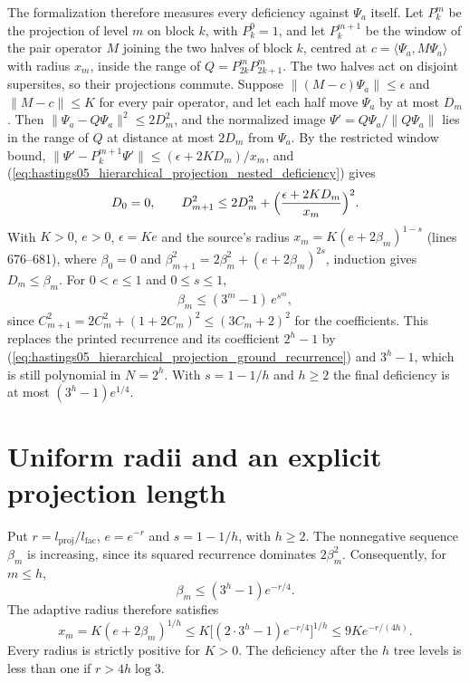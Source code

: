 \documentclass{article}
\begin{document}
The formalization therefore measures every deficiency against $\Psi_a$
itself. Let $P_k^m$ be the projection of level $m$ on block $k$, with
$P_k^0=1$, and let $P_k^{m+1}$ be the window of the pair operator $M$ joining
the two halves of block $k$, centred at $c=\langle\Psi_a,M\Psi_a\rangle$ with
radius $x_m$, inside the range of $Q=P_{2k}^mP_{2k+1}^m$. The two halves act
on disjoint supersites, so their projections commute. Suppose
$\lVert(M-c)\Psi_a\rVert\le\epsilon$ and $\lVert M-c\rVert\le K$ for every
pair operator, and let each half move $\Psi_a$ by at most $D_m$. Then
$\lVert\Psi_a-Q\Psi_a\rVert^2\le2D_m^2$, and the normalized image
$\Psi'=Q\Psi_a/\lVert Q\Psi_a\rVert$ lies in the range of $Q$ at distance at
most $2D_m$ from $\Psi_a$. By the restricted window bound,
$\lVert\Psi'-P_k^{m+1}\Psi'\rVert\le(\epsilon+2KD_m)/x_m$, and
(\ref{eq:hastings05_hierarchical_projection_nested_deficiency}) gives
\begin{align}\label{eq:hastings05_hierarchical_projection_ground_recurrence}
    D_0=0,\qquad
    D_{m+1}^2\le2D_m^2+\Bigl(\frac{\epsilon+2KD_m}{x_m}\Bigr)^2 .
\end{align}
With $K>0$, $e>0$, $\epsilon=Ke$ and the source's radius
$x_m=K(e+2\beta_m)^{1-s}$ (lines 676--681), where $\beta_0=0$ and
$\beta_{m+1}^2=2\beta_m^2+(e+2\beta_m)^{2s}$, induction gives
$D_m\le\beta_m$. For $0<e\le1$ and $0\le s\le1$,
\begin{align}\label{eq:hastings05_hierarchical_projection_ground_bound}
    \beta_m\le(3^m-1)\,e^{s^m},
\end{align}
since $C_{m+1}^2=2C_m^2+(1+2C_m)^2\le(3C_m+2)^2$ for the coefficients. This
replaces the printed recurrence and its coefficient $2^h-1$ by
(\ref{eq:hastings05_hierarchical_projection_ground_recurrence}) and $3^h-1$,
which is still polynomial in $N=2^h$. With $s=1-1/h$ and $h\ge2$ the final
deficiency is at most $(3^h-1)e^{1/4}$.

\section{Uniform radii and an explicit projection length}

Put $r=l_{\mathrm{proj}}/l_{\mathrm{fac}}$, $e=e^{-r}$ and
$s=1-1/h$, with $h\ge2$. The nonnegative sequence $\beta_m$ is
increasing, since its squared recurrence dominates $2\beta_m^2$.
Consequently, for $m\le h$,
\[
 \beta_m\le(3^h-1)e^{-r/4}.
\]
The adaptive radius therefore satisfies
\[
 x_m=K(e+2\beta_m)^{1/h}
 \le K\bigl[(2\cdot3^h-1)e^{-r/4}\bigr]^{1/h}
 \le9K e^{-r/(4h)}.
\]
Every radius is strictly positive for $K>0$. The deficiency after the
$h$ tree levels is less than one if $r>4h\log3$.
\end{document}
